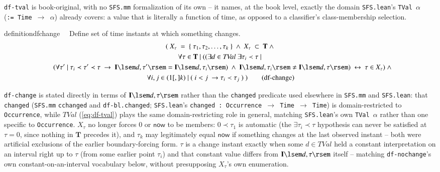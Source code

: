 \pn \texttt{df-tval} is book-original, with no \texttt{SFS.mm} formalization of its own -- it names, at
the book level, exactly the domain \texttt{SFS.lean}'s \texttt{TVal~$\alpha$}
(\texttt{:=~Time~$\to$~$\alpha$}) already covers: a value that is literally a function of time, as
opposed to a classifier's class-membership selection.

\begin{restatable}{definition}{dfchange}~~ Define set of time instants at which something changes.
\begin{gather}
(~X_\tau~=~\{~\tau_1,\tau_2,\ldots,\tau_k~\}~\wedge~X_\tau~\subset~\mathbf{T}~\wedge \notag \\
~\forall \tau \in \mathbf{T}~\vert~((\exists d \in \mathit{TVal}~\exists \tau_i\prec\tau~\vert~ \notag \\
~~~(\forall \tau'~\vert~\tau_i\prec\tau'\prec\tau~\rightarrow~\mathbf{I}\lsem d,\tau'\rsem=\mathbf{I}\lsem d,\tau_i\rsem)~\wedge~\mathbf{I}\lsem d,\tau_i\rsem\neq\mathbf{I}\lsem d,\tau\rsem)~\leftrightarrow~\tau \in X_\tau )~\wedge \notag \\
~\forall i,j\in(1[,]k)~\vert~(~i<j~\rightarrow \tau_i\prec\tau_j~)~) \label{eq:df-change}\tag{df-change}
\end{gather}
\end{restatable}

\pn \texttt{df-change} is stated directly in terms of $\mathbf{I}\lsem d,\tau\rsem$ rather than the
\texttt{changed} predicate used elsewhere in \texttt{SFS.mm} and \texttt{SFS.lean}: that \texttt{changed}
(\texttt{SFS.mm} \texttt{cchanged} and \texttt{df-bl.changed}; \texttt{SFS.lean}'s
\texttt{changed~:~}\texttt{Oc\-currence~$\to$~Time~$\to$~Time}) is domain-restricted to \texttt{Occurrence}, while
$\mathit{TVal}$ (\ref{eq:df-tval}) plays the same domain-restricting role in general, matching
\texttt{SFS.lean}'s own \texttt{TVal~$\alpha$} rather than one specific to \texttt{Occurrence}. $X_\tau$
no longer forces $0$ or $\mathsf{now}$ to be members: $0\prec\tau_1$ is automatic (the
$\exists\tau_i\prec\tau$ hypothesis can never be satisfied at $\tau=0$, since nothing in $\mathbf{T}$
precedes it), and $\tau_k$ may legitimately equal $\mathsf{now}$ if something changes at the last
observed instant -- both were artificial exclusions of the earlier boundary-forcing form. $\tau$ is a
change instant exactly when some $d\in\mathit{TVal}$ held a constant interpretation on an interval right
up to $\tau$ (from some earlier point $\tau_i$) and that constant value differs from
$\mathbf{I}\lsem d,\tau\rsem$ itself -- matching \texttt{df-nochange}'s own constant-on-an-interval
vocabulary below, without presupposing $X_\tau$'s own enumeration. 


